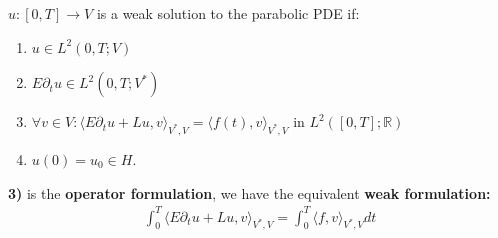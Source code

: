  \begin{definition}
 	$u: [0, T] \rightarrow V$ is a weak solution to the parabolic PDE if:
 	\begin{enumerate}
 		\item $u \in L^2(0, T; V)$
 		\item $E \partial_t u \in L^2(0, T; V^*)$
 		\item $\forall v \in V: \langle E \partial_t u + L u , v \rangle_{V^*, V} = \langle f(t), v \rangle_{V^*, V}$ in $L^2([0, T]; \mathbb{R})$
 		\item $u(0) = u_0 \in H$. 
 	\end{enumerate}
 \end{definition}
 \begin{remark}
 \textbf{3)} is the \textbf{operator formulation}, we have the equivalent \textbf{weak formulation:}
 \begin{align*}
 	\int_0^T \langle E\partial_t u + Lu, v\rangle_{V^*, V}  = \int_0^T \langle f, v \rangle_{V^*, V} dt
 \end{align*}	
 \end{remark}

